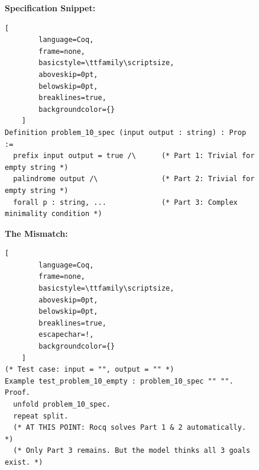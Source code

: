 \begin{figure}[t!]
    \centering
    \begin{tcolorbox}[
        enhanced,
        title=\textbf{Failure Mode 1: The Phantom Goal Error (HumanEval/10)},
        fonttitle=\bfseries\small,
        colback=blue!3!white,    %
        colframe=blue!50!black,  %
        boxrule=0.8pt,
        arc=2pt,
        before skip=10pt,
        after skip=10pt
    ]
    
    \textbf{Specification Snippet:}
    \vspace{2pt}
    
    \begin{tcolorbox}[
        colback=white,
        colframe=white,
        frame hidden,       %
        boxrule=0pt,
        sharp corners,
        top=3pt, bottom=3pt, left=3pt, right=3pt
    ]
    \begin{lstlisting}[
        language=Coq, 
        frame=none, 
        basicstyle=\ttfamily\scriptsize, 
        aboveskip=0pt,
        belowskip=0pt,
        breaklines=true,
        backgroundcolor={} 
    ]
Definition problem_10_spec (input output : string) : Prop :=
  prefix input output = true /\      (* Part 1: Trivial for empty string *)
  palindrome output /\               (* Part 2: Trivial for empty string *)
  forall p : string, ...             (* Part 3: Complex minimality condition *)
    \end{lstlisting}
    \end{tcolorbox}

    \vspace{0.2cm}
    
    \textbf{The Mismatch:}
    \vspace{2pt}
    
    \begin{tcolorbox}[
        colback=white,
        colframe=white,
        frame hidden,
        boxrule=0pt,
        sharp corners,
        top=3pt, bottom=3pt, left=3pt, right=3pt
    ]
    \begin{lstlisting}[
        language=Coq, 
        frame=none, 
        basicstyle=\ttfamily\scriptsize,
        aboveskip=0pt,
        belowskip=0pt,
        breaklines=true,
        escapechar=!,
        backgroundcolor={} 
    ]
(* Test case: input = "", output = "" *)
Example test_problem_10_empty : problem_10_spec "" "".
Proof.
  unfold problem_10_spec.
  repeat split.
  (* AT THIS POINT: Rocq solves Part 1 & 2 automatically. *)
  (* Only Part 3 remains. But the model thinks all 3 goals exist. *)


\end{lstlisting}
\end{tcolorbox}
\end{tcolorbox}
\end{figure}
